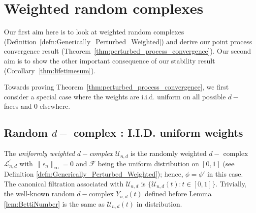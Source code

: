 \documentclass[12pt]{amsart}
\newcommand{\gt}[1]{\textcolor{blue}{#1}}
\renewcommand{\gt}[1]{#1}
\newtheorem{definition}[theorem]{Definition}
\numberwithin{equation}{section}
\numberwithin{theorem}{section}
\newcommand{\1}{\mathbf{1}}
\def\F{\mathcal{F}}
\def\sF{\mathscr{F}}
\def\U{\mathcal{U}}
\def\Lp{\mathcal{L}^\prime}
\def\K{\mathcal{K}}
\begin{document}
%

\section{Weighted random complexes}
\label{sec:weighted_random}

\gt{Our first aim here is to look at weighted random complexes (Definition~\ref{defn:Generically_Perturbed_Weighted}) and derive our point process convergence result (Theorem~\ref{thm:perturbed_process_convergence}).
Our second aim is to show the other important consequence of our stability result (Corollary~\ref{thm:lifetimesum}).}

\gt{Towards proving Theorem~\ref{thm:perturbed_process_convergence}, we first consider a special case where the weights are i.i.d. uniform on all possible $d-$faces and $0$ elsewhere.}


\subsection{Random $d-$ complex : I.I.D. uniform weights}
\label{sec:uniformly_Weighted_Complex}

%

%
%
The {\em uniformly weighted $d-$complex } $\U_{n, d}$ is the randomly weighted $d-$ complex $\Lp_{n, d}$ with $\|\epsilon_n\|_{\infty} = 0$ and $\sF$ being the uniform distribution on \gt{$[0, 1]$} (see Definition \ref{defn:Generically_Perturbed_Weighted}); \gt{hence, $\phi = \phi'$ in this case}. The canonical filtration associated with $\U_{n, d}$ is $\{\U_{n, d}(t) : t \in [0, 1]\}.$ Trivially, the well-known random $d-$complex $Y_{n,d}(t)$ defined before Lemma \ref{lem:BettiNumber} is the same as $\U_{n,d}(t)$ in distribution.
%
\end{document}
